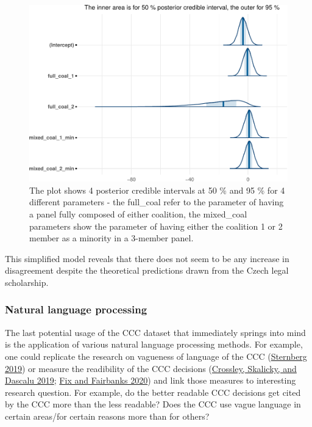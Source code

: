 \documentclass[
  11pt,
]{article}
\begin{document}
\begin{figure}
\centering
\includegraphics{apex_courts_dataset_files/figure-latex/coalitions-1.pdf}
\caption{The plot shows 4 posterior credible intervals at 50 \% and 95
\% for 4 different parameters - the full\_coal refer to the parameter of
having a panel fully composed of either coalition, the mixed\_coal
parameters show the parameter of having either the coalition 1 or 2
member as a minority in a 3-member panel.}
\end{figure}

This simplified model reveals that there does not seem to be any
increase in disagreement despite the theoretical predictions drawn from
the Czech legal scholarship.

\hypertarget{natural-language-processing}{%
\subsubsection{Natural language
processing}\label{natural-language-processing}}

The last potential usage of the CCC dataset that immediately springs
into mind is the application of various natural language processing
methods. For example, one could replicate the research on vagueness of
language of the CCC
(\protect\hyperlink{ref-sternbergNoPublicNo2019}{Sternberg 2019}) or
measure the readibility of the CCC decisions
(\protect\hyperlink{ref-crossleyMovingClassicReadability2019}{Crossley,
Skalicky, and Dascalu 2019};
\protect\hyperlink{ref-fixEffectOpinionReadability2020}{Fix and
Fairbanks 2020}) and link those measures to interesting research
question. For example, do the better readable CCC decisions get cited by
the CCC more than the less readable? Does the CCC use vague language in
certain areas/for certain reasons more than for others?
\end{document}

